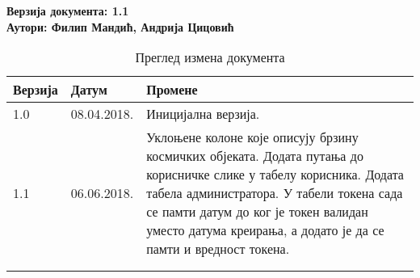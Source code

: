 \noindent
\textbf{Верзија документа: 1.1} \\
\textbf{Аутори: Филип Мандић, Андрија Цицовић}

\begin{table}[h!]
\centering
\small

    \begin{tabular}{ || m{} | m{} | m{} || }
    \hline
    \textbf{Верзија} & \textbf{Датум} & \textbf{Промене} \\
    \hline
    \hline
    1.0 & 08.04.2018. &
    Иницијална верзија. \\
    \hline
    1.1 & 06.06.2018. &
    Уклоњене колоне које описују брзину космичких објеката.
    Додата путања до корисничке слике у табелу корисника.
    Додата табела администратора.
    У табели токена сада се памти датум до ког је токен валидан
    уместо датума креирања, а додато је да се памти и вредност
    токена.\\
    & & \\
    \hline
    & & \\
    \hline
    \end{tabular}
    \caption{Преглед измена документа}
    \label{table:1}

\end{table}
\newpage
